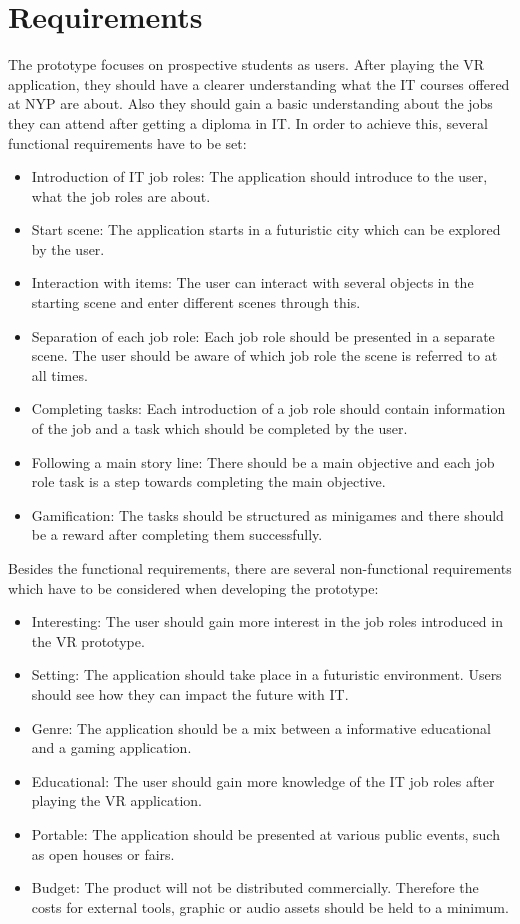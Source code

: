 \section{Requirements}
The prototype focuses on prospective students as users. After playing the VR application, they should have a clearer understanding what the IT courses offered at NYP are about. Also they should gain a basic understanding about the jobs they can attend after getting a diploma in IT. In order to achieve this, several functional requirements have to be set:\\
\begin{itemize}
\item Introduction of IT job roles: The application should introduce to the user, what the job roles are about.
\item Start scene: The application starts in a futuristic city which can be explored by the user.
\item Interaction with items: The user can interact with several objects in the starting scene and enter different scenes through this.
\item Separation of each job role: Each job role should be presented in a separate scene. The user should be aware of which job role the scene is referred to at all times.
\item Completing tasks: Each introduction of a job role should contain information of the job and a task which should be completed by the user.
\item Following a main story line: There should be a main objective and each job role task is a step towards completing the main objective.
\item Gamification: The tasks should be structured as minigames and there should be a reward after completing them successfully.

\end{itemize}
Besides the functional requirements, there are several non-functional requirements which have to be considered when developing the prototype:
\begin{itemize}
\item Interesting: The user should gain more interest in the job roles introduced in the VR prototype.
\item Setting: The application should take place in a futuristic environment. Users should see how they can impact the future with IT.
\item Genre: The application should be a mix between a informative educational and a gaming application.
\item Educational: The user should gain more knowledge of the IT job roles after playing the VR application.
\item Portable: The application should be presented at various public events, such as open houses or fairs.
\item Budget: The product will not be distributed commercially. Therefore the costs for external tools, graphic or audio assets should be held to a minimum.
\end{itemize}

